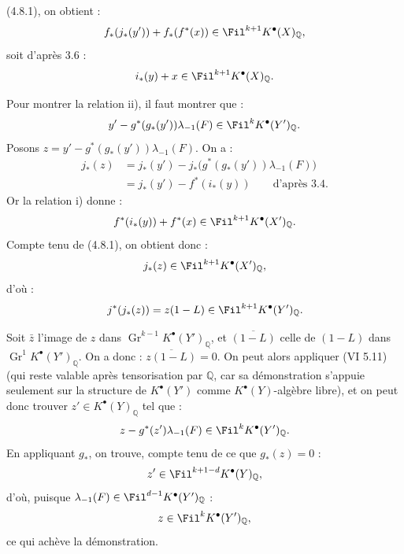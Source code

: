 
(4.8.1), on obtient :
\[
  f_*(j_*(y'))+f_*(f^*(x))\in\Fil^{k+1}K^{\bullet}(X)_{\mathbb Q},
\]
soit d'après 3.6 :
\[
  i_*(y)+x\in\Fil^{k+1}K^{\bullet}(X)_{\mathbb Q}.
\]

Pour montrer la relation ii), il faut montrer que :
\[
  y'-g^*(g_*(y'))\lambda_{-1}(F)\in\Fil^kK^{\bullet}(Y')_{\mathbb Q}.
\]
Posons \(z=y'-g^*(g_*(y'))\lambda_{-1}(F)\). On a :
\[
\begin{aligned}
j_*(z)
  &=j_*(y')-j_*\bigl(g^*(g_*(y'))\lambda_{-1}(F)\bigr)\\
  &=j_*(y')-f^*(i_*(y))\qquad\text{d'après 3.4.}
\end{aligned}
\]
Or la relation i) donne :
\[
  f^*(i_*(y))+f^*(x)\in\Fil^{k+1}K^{\bullet}(X')_{\mathbb Q}.
\]
Compte tenu de (4.8.1), on obtient donc :
\[
  j_*(z)\in\Fil^{k+1}K^{\bullet}(X')_{\mathbb Q},
\]
d'où :
\[
  j^*(j_*(z))=z(1-L)\in\Fil^{k+1}K^{\bullet}(Y')_{\mathbb Q}.
\]

Soit \(\bar z\) l'image de \(z\) dans \(\operatorname{Gr}^{k-1}K^{\bullet}(Y')_{\mathbb Q}\), et \(\overline{(1-L)}\) celle de \((1-L)\) dans \(\operatorname{Gr}^{1}K^{\bullet}(Y')_{\mathbb Q}\). On a donc : \(\overline{z(1-L)}=0\). On peut alors appliquer (VI 5.11) (qui reste valable après tensorisation par \(\mathbb Q\), car sa démonstration s'appuie seulement sur la structure de \(K^{\bullet}(Y')\) comme \(K^{\bullet}(Y)\)-algèbre libre), et on peut donc trouver \(z'\in K^{\bullet}(Y)_{\mathbb Q}\) tel que :
\[
  z-g^*(z')\lambda_{-1}(F)\in\Fil^kK^{\bullet}(Y')_{\mathbb Q}.
\]
En appliquant \(g_*\), on trouve, compte tenu de ce que \(g_*(z)=0\) :
\[
  z'\in\Fil^{k+1-d}K^{\bullet}(Y)_{\mathbb Q},
\]
d'où, puisque \(\lambda_{-1}(F)\in\Fil^{d-1}K^{\bullet}(Y')_{\mathbb Q}\) :
\[
  z\in\Fil^kK^{\bullet}(Y')_{\mathbb Q},
\]
ce qui achève la démonstration.

